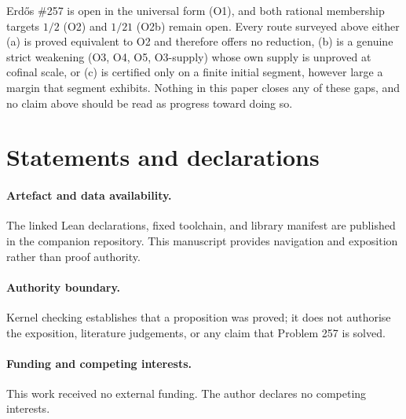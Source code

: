 \documentclass[11pt]{article}
\theoremstyle{plain}
\theoremstyle{definition}
\theoremstyle{remark}
\begin{document}
Erd\H{o}s \#257 is open in the universal form (O1), and both rational
membership targets $1/2$ (O2) and $1/21$ (O2b) remain open. Every route surveyed above either (a) is proved equivalent to O2 and therefore offers no
reduction, (b) is a genuine strict weakening (O3, O4, O5, O3-supply) whose own supply is
unproved at cofinal scale, or (c) is certified only on a finite initial segment, however large a
margin that segment exhibits. Nothing in this paper closes any of these gaps, and no claim above
should be read as progress toward doing so.

\clearpage
\section*{Statements and declarations}

\paragraph{Artefact and data availability.} The linked Lean declarations,
fixed toolchain, and library manifest are published in the companion
repository. This manuscript provides navigation and exposition rather than
proof authority.

\paragraph{Authority boundary.} Kernel checking establishes that a proposition
was proved; it does not authorise the exposition, literature judgements, or any
claim that Problem 257 is solved.

\paragraph{Funding and competing interests.} This work received no external
funding. The author declares no competing interests.
\end{document}
